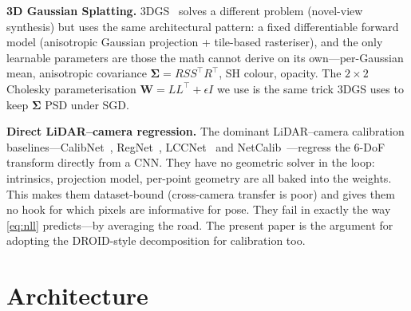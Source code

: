 \documentclass[10pt,conference,a4paper]{IEEEtran}
\newcommand{\W}{\mathbf{W}}
\newcommand{\Sig}{\boldsymbol{\Sigma}}
\begin{document}
\textbf{3D Gaussian Splatting.}
3DGS~\cite{kerbl20233dgs} solves a different problem (novel-view
synthesis) but uses the same architectural pattern: a fixed
differentiable forward model (anisotropic Gaussian projection +
tile-based rasteriser), and the only learnable parameters are those the
math cannot derive on its own---per-Gaussian mean, anisotropic
covariance $\Sig = R S S^\top R^\top$, SH colour, opacity. The
$2{\times}2$ Cholesky parameterisation $\W = LL^\top + \epsilon I$ we
use is the same trick 3DGS uses to keep $\Sig$ PSD under SGD.

\textbf{Direct LiDAR--camera regression.}
The dominant LiDAR--camera calibration baselines---CalibNet~\cite{iyer2018calibnet},
RegNet~\cite{schneider2017regnet}, LCCNet~\cite{lv2021lccnet} and
NetCalib~\cite{shi2020netcalib}---regress the 6-DoF transform directly
from a CNN. They have no geometric solver in the loop: intrinsics,
projection model, per-point geometry are all baked into the weights.
This makes them dataset-bound (cross-camera transfer is poor) and
gives them no hook for which pixels are informative for pose. They fail
in exactly the way \cref{eq:nll} predicts---by averaging the road. The
present paper is the argument for adopting the DROID-style
decomposition for calibration too.

\section{Architecture}\label{sec:arch}
\end{document}

